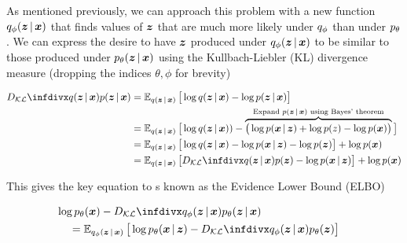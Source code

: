 As mentioned previously, we can approach this problem with a new function $\qphi \given{\vz}{\vx}$ that finds values of $\boldsymbol{z}$ that are much more likely under $q_{\phi}$ than under $p_{\theta}$. We can express the desire to have $\boldsymbol{z}$ produced under $\qphi \given{\vz}{\vx}$ to be similar to those produced under $\ptheta \given{\vz}{\vx}$ using the Kullbach-Liebler (KL) divergence measure (dropping the indices $\theta, \phi$ for brevity)

\begin{equation}
\begin{split}
\KL{q \given{\vz}{\vx}}{p \given{\vz}{\vx}} &= \E_{q \given{\vz}{\vx} } \big [\log{q \given{\vz}{\vx}} - \log{p \given{\vz}{\vx}} \big ] \\
&= \E_{q \given{\vz}{\vx} }\big {[} \log{q \given{\vz}{\vx})} - \overbrace{ \big{(} \log{p \given{\vx}{\vz}} + \log{p(z)} - \log{p(\vx)} \big{)} }^{\text{Expand $p\given{\vz}{\vx}$ using Bayes' theorem}} \big ]\\
&= \E_{q \given{\vz}{\vx} } \big{[} \log{q \given{\vz}{\vx}} - \log{p \given{\vx}{\vz}} - \log{p(\vz)} \big{]} + \log{p(\vx)} \\
&= \E_{q \given{\vz}{\vx} } \big{[} \KL{q \given{\vz}{\vx}}{p(\vz)} - \log{p \given{\vx}{\vz}} \big{]} + \log{p(\vx)}
\end{split}
\label{kl-eq}
\end{equation}

This gives the key equation to \vae{}s known as the Evidence Lower Bound (ELBO)

\begin{align}
\nonumber \lefteqn{\log{\ptheta(\vx)} - \KL{\qphi \given{\vz}{\vx}}{\ptheta \given{\vz}{\vx}}} \\
& & & = \E_{\qphi \given{\vz}{\vx} } \big{[} \log{\ptheta \given{\vx}{\vz}} - \KL{\qphi \given{\vz}{\vx}}{\ptheta(\vz)} \big{]}
\label{eq_vae}
\end{align}

